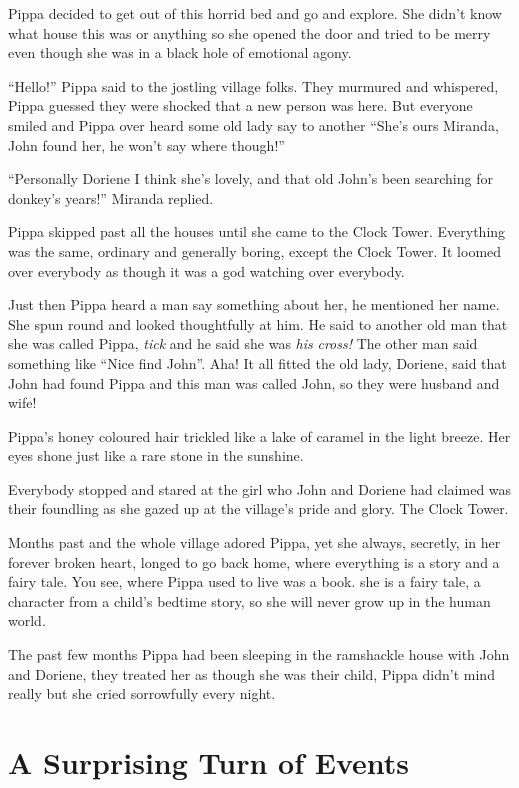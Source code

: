 Pippa decided to get out of this horrid bed and go and explore. She
didn't know what house this was or anything so she opened the door and
tried to be merry even though she was in a black hole of emotional
agony.

``Hello!'' Pippa said to the jostling village folks. They murmured and
whispered, Pippa guessed they were shocked that a new person was here.
But everyone smiled and Pippa over heard some old lady say to another
``She's ours Miranda, John found her, he won't say where though!''

``Personally Doriene I think she's lovely, and that old John's been
searching for donkey's years!'' Miranda replied.

Pippa skipped past all the houses until she came to the Clock Tower.
Everything was the same, ordinary and generally boring, except the Clock
Tower. It loomed over everybody as though it was a god watching over
everybody.

Just then Pippa heard a man say something about her, he mentioned her
name. She spun round and looked thoughtfully at him. He said to another
old man that she was called Pippa, \emph{tick} and he said she was
\emph{his} \emph{cross!} The other man said something like ``Nice find
John''. Aha! It all fitted the old lady, Doriene, said that John had
found Pippa and this man was called John, so they were husband and wife!

Pippa's honey coloured hair trickled like a lake of caramel in the light
breeze. Her eyes shone just like a rare stone in the sunshine.

Everybody stopped and stared at the girl who John and Doriene had
claimed was their foundling as she gazed up at the village's pride and
glory. The Clock Tower.

Months past and the whole village adored Pippa, yet she always,
secretly, in her forever broken heart, longed to go back home, where
everything is a story and a fairy tale. You see, where Pippa used to
live was a book. she is a fairy tale, a character from a child's bedtime
story, so she will never grow up in the human world.

The past few months Pippa had been sleeping in the ramshackle house with
John and Doriene, they treated her as though she was their child, Pippa
didn't mind really but she cried sorrowfully every night.

\chapter{A Surprising Turn of Events}

